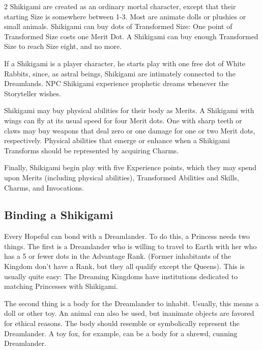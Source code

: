 \begin{multicols}{2}
Shikigami are created as an ordinary mortal character, except that their starting Size is somewhere between 1-3. Most are animate dolls or plushies or small animals. Shikigami can buy dots of Transformed Size: One point of Transformed Size costs one Merit Dot. A Shikigami can buy enough Transformed Size to reach Size eight, and no more.

If a Shikigami is a player character, he starts play with one free dot of White Rabbits, since, as astral beings, Shikigami are intimately connected to the Dreamlands. NPC Shikigami experience prophetic dreams whenever the Storyteller wishes. 

Shikigami may buy physical abilities for their body as Merits. A Shikigami with wings can fly at its usual speed for four Merit dots. One with sharp teeth or claws may buy weapons that deal zero or one damage for one or two Merit dots, respectively. Physical abilities that emerge or enhance when a Shikigami Transforms should be represented by acquiring Charms. 

Finally, Shikigami begin play with five Experience points, which they may spend upon Merits (including physical abilities), Transformed Abilities and Skills, Charms, and Invocations.

\subsection*{Binding a Shikigami}

Every Hopeful can bond with a Dreamlander. To do this, a Princess needs two things. The first is a Dreamlander who is willing to travel to Earth with her who has a 5 or fewer dots in the Advantage Rank. (Former inhabitants of the Kingdom don't have a Rank, but they all qualify except the Queens). This is usually quite easy: The Dreaming Kingdoms have institutions dedicated to matching Princesses with Shikigami. 

The second thing is a body for the Dreamlander to inhabit. Usually, this means a doll or other toy. An animal can also be used, but inanimate objects are favored for ethical reasons. The body should resemble or symbolically represent the Dreamlander. A toy fox, for example, can be a body for a shrewd, cunning Dreamlander. 


\end{multicols}
